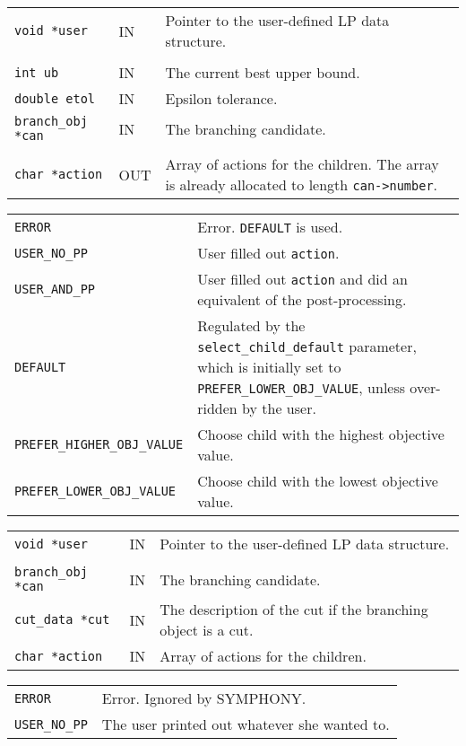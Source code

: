 \documentclass[twoside,11pt]{article}
\begin{document}
{\newpage
\clearpage
\samepage \begin{tabular}{llp{270pt}}
{\tt void *user} &  IN & Pointer to the user-defined LP data structure. \\ 
& & \\ 
{\tt int ub} & IN & The current best upper bound. \\ 
{\tt double etol} & IN & Epsilon tolerance. \\ 
{\tt branch\_obj *can} & IN & The branching candidate. \\ 
& & \\ 
{\tt char *action} & OUT & Array of actions for the children. The array is
already allocated to length {\tt can->number}.\\ 
\end{tabular}
}

{\newpage
\clearpage
\samepage \begin{tabular}{lp{265pt}}
{\tt ERROR} & Error. {\tt DEFAULT} is used. \\ 
{\tt USER\_NO\_PP} & User filled out {\tt *action}. \\ 
{\tt USER\_AND\_PP} & User filled out {\tt *action} and did an
equivalent of the post-processing.\\ 
{\tt DEFAULT} & Regulated by the {\tt select\_child\_default}
parameter, which is initially set to {\tt PREFER\_LOWER\_OBJ\_VALUE},
unless over-ridden by the user. \\ 
{\tt PREFER\_HIGHER\_OBJ\_VALUE} & Choose child with the highest
objective value.\\ 
{\tt PREFER\_LOWER\_OBJ\_VALUE} & Choose child with the lowest
objective value.\\ 
\end{tabular}
}

{\newpage
\clearpage
\samepage \begin{tabular}{llp{285pt}}
{\tt void *user} &  IN & Pointer to the user-defined LP data structure. \\ 
& & \\ 
{\tt branch\_obj *can} & IN & The branching candidate. \\ 
{\tt cut\_data *cut} & IN & The description of the cut if the
branching object is a cut. \\ 
{\tt char *action} & IN & Array of actions for the children. \\ 
\end{tabular}
}

{\newpage
\clearpage
\samepage \begin{tabular}{lp{300pt}}
{\tt ERROR} & Error. Ignored by {\sc SYMPHONY}. \\ 
{\tt USER\_NO\_PP} & The user printed out whatever she wanted to. \\ 
\end{tabular}
}
\end{document}
